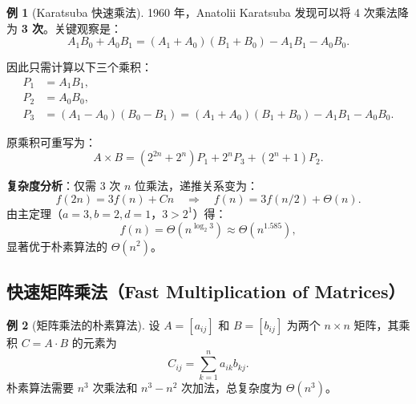 \documentclass[UTF8,11pt,a4paper]{ctexbook}   %
\theoremstyle{definition}
\newtheorem{example}{例}[section]
\begin{document}
\begin{example}[Karatsuba 快速乘法]
1960 年，Anatolii Karatsuba 发现可以将 4 次乘法降为 \textbf{3 次}。关键观察是：
\[
A_1 B_0 + A_0 B_1 = (A_1 + A_0)(B_1 + B_0) - A_1 B_1 - A_0 B_0.
\]

因此只需计算以下三个乘积：
\begin{align*}
P_1 &= A_1 B_1,\\
P_2 &= A_0 B_0,\\
P_3 &= (A_1 - A_0)(B_0 - B_1) = (A_1 + A_0)(B_1 + B_0) - A_1 B_1 - A_0 B_0.
\end{align*}

原乘积可重写为：
\[
A\times B = (2^{2n} + 2^n)P_1 + 2^n P_3 + (2^n + 1)P_2.
\]

\textbf{复杂度分析}：仅需 3 次 $n$ 位乘法，递推关系变为：
\[
f(2n) = 3f(n) + Cn \quad\Longrightarrow\quad f(n) = 3f(n/2) + \Theta(n).
\]
由主定理（$a=3,b=2,d=1$，$3>2^1$）得：
\[
f(n) = \Theta(n^{\log_2 3}) \approx \Theta(n^{1.585}),
\]
显著优于朴素算法的 $\Theta(n^2)$。
\end{example}

\subsection{快速矩阵乘法（Fast Multiplication of Matrices）}

\begin{example}[矩阵乘法的朴素算法]
设 $A=[a_{ij}]$ 和 $B=[b_{ij}]$ 为两个 $n\times n$ 矩阵，其乘积 $C=A\cdot B$ 的元素为
\[
C_{ij} = \sum_{k=1}^{n} a_{ik} b_{kj}.
\]
朴素算法需要 $n^3$ 次乘法和 $n^3-n^2$ 次加法，总复杂度为 $\Theta(n^3)$。
\end{example}
\end{document}
